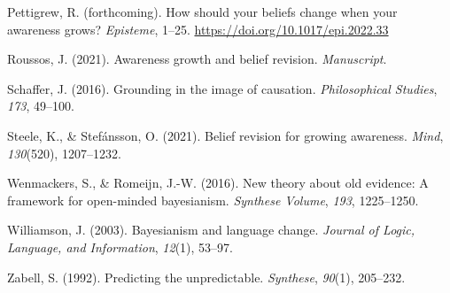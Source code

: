 \documentclass[
  11pt,
  dvipsnames,enabledeprecatedfontcommands]{scrartcl}
\newlength{\cslhangindent}
\newlength{\cslentryspacingunit} %
\newenvironment{CSLReferences}[2] %
 {%
  \setlength{\parindent}{0pt}
  \ifodd #1
  \let\oldpar\par
  \def\par{\hangindent=\cslhangindent\oldpar}
  \fi
  \setlength{\parskip}{#2\cslentryspacingunit}
 }%
 {}
\begin{document}
\begin{CSLReferences}{1}{0}
\leavevmode{}%
Pettigrew, R. (forthcoming). How should your beliefs change when your
awareness grows? \emph{Episteme}, 1--25.
\url{https://doi.org/10.1017/epi.2022.33}

\leavevmode{}%
Roussos, J. (2021). Awareness growth and belief revision.
\emph{Manuscript}.

\leavevmode{}%
Schaffer, J. (2016). Grounding in the image of causation.
\emph{Philosophical Studies}, \emph{173}, 49--100.

\leavevmode{}%
Steele, K., \& Stefánsson, O. (2021). Belief revision for growing
awareness. \emph{Mind}, \emph{130}(520), 1207--1232.

\leavevmode{}%
Wenmackers, S., \& Romeijn, J.-W. (2016). New theory about old evidence:
A framework for open-minded bayesianism. \emph{Synthese Volume},
\emph{193}, 1225--1250.

\leavevmode{}%
Williamson, J. (2003). Bayesianism and language change. \emph{Journal of
Logic, Language, and Information}, \emph{12}(1), 53--97.

\leavevmode{}%
Zabell, S. (1992). Predicting the unpredictable. \emph{Synthese},
\emph{90}(1), 205--232.

\end{CSLReferences}
\end{document}
